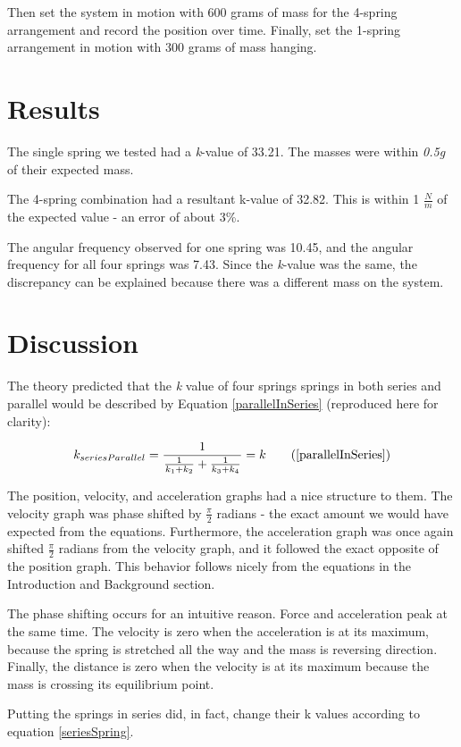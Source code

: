 \documentclass[]{article}
\begin{document}
	Then set the system in motion with 600 grams of mass for the 4-spring arrangement and record the position over time. Finally, set the 1-spring arrangement in motion with 300 grams of mass hanging.
	
	
	\section{Results}
	
	The single spring we tested had a \textit{k}-value of 33.21. The masses were within \textit{0.5g} of their expected mass.
	
	The 4-spring combination had a resultant k-value of 32.82. This is within 1 \textit{$\frac{N}{m}$} of the expected value - an error of about 3\%.
	
	The angular frequency observed for one spring was 10.45, and the angular frequency for all four springs was 7.43. Since the \textit{k}-value was the same, the discrepancy can be explained because there was a different mass on the system.
	
	\section{Discussion}
	The theory predicted that the \textit{k} value of four springs springs in both series and parallel would be described by Equation \ref{parallelInSeries} (reproduced here for clarity):
	
	\begin{equation*}
	k_{seriesParallel}=\frac{1}{\frac{1}{k_1+k_2} + \frac{1}{k_3+k_4}} = k \tag{\ref{parallelInSeries}}
	\end{equation*}
	
	The position, velocity, and acceleration graphs had a nice structure to them. The velocity graph was phase shifted by $ \frac{\pi}{2} $ radians - the exact amount we would have expected from the equations. Furthermore, the acceleration graph was once again shifted $\frac{\pi}{2} $ radians from the velocity graph, and it followed the exact opposite of the position graph. This behavior follows nicely from the equations in the Introduction and Background section.
	
	The phase shifting occurs for an intuitive reason. Force and acceleration peak at the same time. The velocity is zero when the acceleration is at its maximum, because the spring is stretched all the way and the mass is reversing direction. Finally, the distance is zero when the velocity is at its maximum because the mass is crossing its equilibrium point.
	
	Putting the springs in series did, in fact, change their k values according to equation \ref{seriesSpring}.
	
\end{document}
